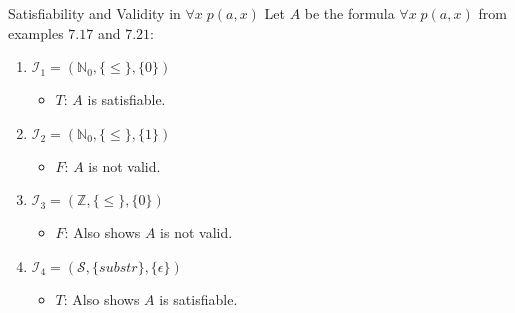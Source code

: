 \documentclass[style=sailor,size=12pt,mode=present]{powerdot}
\theoremstyle{definition}
\newcommand{\bb}[1]{\mathbb{#1}}
\newcommand{\Z}{\bb{Z}}
\newcommand{\N}{\bb{N}}
\begin{document}
\begin{wideslide}[bm=,toc=]{Satisfiability and Validity in $\forall x \; p(a,x)$}
Let $A$ be the formula $\forall x \; p(a,x)$ from examples $7.17$ and $7.21$:
\begin{enumerate}
\item<2-> $\mathcal{I}_1 = (\N_0,\{\leq\},\{0\})$
\begin{itemize}
\item<3-> $T$: $A$ is satisfiable. 
\end{itemize}
\item<4-> $\mathcal{I}_2 = (\N_0,\{\leq\},\{1\})$
\begin{itemize}
\item<5-> $F$: $A$ is not valid. 
\end{itemize}
\item<6-> $\mathcal{I}_3 = (\Z,\{\leq\},\{0\})$
\begin{itemize}
\item<7-> $F$: Also shows $A$ is not valid. 
\end{itemize}
\item<8-> $\mathcal{I}_4 = (\mathcal{S},\{substr\},\{ \epsilon \})$
\begin{itemize}
\item<9-> $T$: Also shows $A$ is satisfiable. 
\end{itemize}
\end{enumerate}
\end{wideslide}
\end{document}
